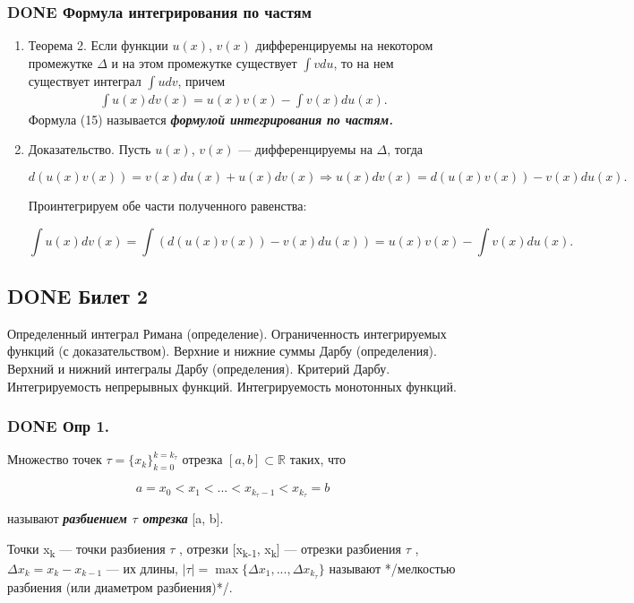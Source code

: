 \documentclass[11pt]{article}
\begin{document}
\subsubsection{{\bfseries\sffamily DONE} Формула интегрирования по частям}
\label{sec:orga2b1bbd}
\begin{enumerate}
\item Теорема 2.
\label{sec:org42f4271}
Если функции \(u(x)\), \(v(x)\) дифференцируемы на некотором промежутке
\(\Delta\) и на этом промежутке существует \(\int vdu\), то на нем существует интеграл 
\(\int udv\), причем
\begin{eqnarray}
\int u(x)dv(x)=u(x)v(x)-\int v(x)du(x).
\end{eqnarray}
Формула (15) называется \textbf{\emph{формулой интегрирования по частям.}}
\item Доказательство.
\label{sec:org8a34f36}
Пусть \(u(x)\), \(v(x)\) — дифференцируемы на \(\Delta\), тогда

$$
d(u(x)v(x))=v(x)du(x)+u(x)dv(x)\Rightarrow u(x)dv(x)=d(u(x)v(x))-v(x)du(x).
$$

Проинтегрируем обе части полученного равенства:

$$
\int u(x)dv(x)=\int(d(u(x)v(x))-v(x)du(x))=u(x)v(x)-\int v(x)du(x).
$$
\end{enumerate}

\subsection{{\bfseries\sffamily DONE} Билет 2}
\label{sec:org3ea6164}
Определенный интеграл Римана (определение). Ограниченность интегрируемых функций (с доказательством). Верхние и нижние суммы Дарбу (определения). Верхний и нижний интегралы Дарбу (определения). Критерий Дарбу. Интегрируемость непрерывных функций. Интегрируемость монотонных функций.

\subsubsection{{\bfseries\sffamily DONE} Опр 1.}
\label{sec:org7af7f91}
Множество точек \(\tau=\{x_k\}_{k=0}^{k=k_\tau}\) отрезка \([a,b]\subset \mathbb{R}\) таких, что

$$
a=x_0 < x_1 < ... < x_{k_\tau-1} < x_{k_\tau} = b
$$

называют \textbf{\emph{разбиением \(\tau\) отрезка}} [a, b]. 

Точки x\textsubscript{k} — точки разбиения \(\tau\) , отрезки [x\textsubscript{k-1}, x\textsubscript{k}]
 — отрезки разбиения \(\tau\) , \(\Delta x_k = x_k − x_{k-1}\) — их длины, \(|\tau | = \max \{\Delta x_1 ,... , \Delta x_{k_\tau}\}\) называют */мелкостью разбиения (или диаметром разбиения)*/.
\end{document}
